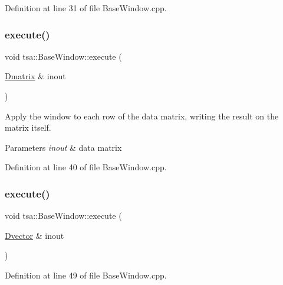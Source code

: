 Definition at line 31 of file Base\+Window.\+cpp.

\mbox{\label{classtsa_1_1_base_window_a34b933da998ba8137d0e0def7514d2cb}} 
\subsubsection{\texorpdfstring{execute()}{execute()}\hspace{0.1cm}{\footnotesize\ttfamily [3/4]}}
{\footnotesize\ttfamily void tsa\+::\+Base\+Window\+::execute (\begin{DoxyParamCaption}\item[{\hyperlink{namespacetsa_ad260cd21c1891c4ed391fe788569aba4}{Dmatrix} \&}]{inout }\end{DoxyParamCaption})}

Apply the window to each row of the data matrix, writing the result on the matrix itself.


\begin{DoxyParams}{Parameters}
{\em inout} & data matrix \\
\hline
\end{DoxyParams}


Definition at line 40 of file Base\+Window.\+cpp.

\mbox{\label{classtsa_1_1_base_window_abadd3d1ef579310ab440a70d77e1d46d}} 
\subsubsection{\texorpdfstring{execute()}{execute()}\hspace{0.1cm}{\footnotesize\ttfamily [4/4]}}
{\footnotesize\ttfamily void tsa\+::\+Base\+Window\+::execute (\begin{DoxyParamCaption}\item[{\hyperlink{namespacetsa_a8900fb03d849baf447a1a0efe2561fb2}{Dvector} \&}]{inout }\end{DoxyParamCaption})}



Definition at line 49 of file Base\+Window.\+cpp.

\mbox{\label{classtsa_1_1_base_window_aa74b29105d94caa521d308198e8e6643}} 
